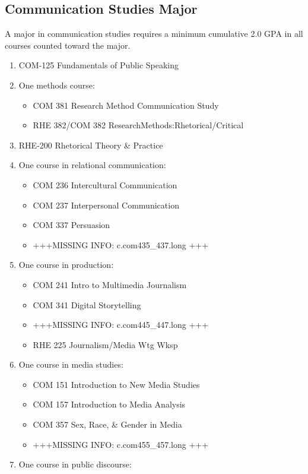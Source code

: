 \documentclass[
  letterpaper,
]{scrbook}
\providecommand{\tightlist}{%
  \setlength{\itemsep}{0pt}\setlength{\parskip}{0pt}}
\begin{document}
\subsection{Communication Studies
Major}\label{communication-studies-major}

A major in communication studies requires a minimum cumulative 2.0 GPA
in all courses counted toward the major.

\begin{enumerate}
\def\labelenumi{\arabic{enumi}.}
\tightlist
\item
  COM-125 Fundamentals of Public Speaking
\item
  One methods course:

  \begin{itemize}
  \tightlist
  \item
    COM 381 Research Method Communication Study
  \item
    RHE 382/COM 382 ResearchMethods:Rhetorical/Critical
  \end{itemize}
\item
  RHE-200 Rhetorical Theory \& Practice
\item
  One course in relational communication:

  \begin{itemize}
  \tightlist
  \item
    COM 236 Intercultural Communication
  \item
    COM 237 Interpersonal Communication
  \item
    COM 337 Persuasion
  \item
    +++MISSING INFO: c.com435\_437.long +++
  \end{itemize}
\item
  One course in production:

  \begin{itemize}
  \tightlist
  \item
    COM 241 Intro to Multimedia Journalism
  \item
    COM 341 Digital Storytelling
  \item
    +++MISSING INFO: c.com445\_447.long +++
  \item
    RHE 225 Journalism/Media Wtg Wksp
  \end{itemize}
\item
  One course in media studies:

  \begin{itemize}
  \tightlist
  \item
    COM 151 Introduction to New Media Studies
  \item
    COM 157 Introduction to Media Analysis
  \item
    COM 357 Sex, Race, \& Gender in Media
  \item
    +++MISSING INFO: c.com455\_457.long +++
  \end{itemize}
\item
  One course in public discourse:


\end{enumerate}
\end{document}
